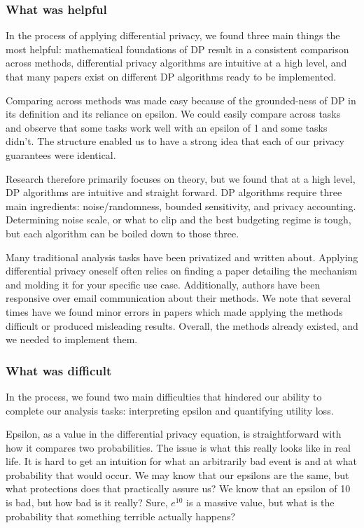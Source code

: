 \documentclass[12pt,letterpaper]{article}
\begin{document}
\subsubsection{What was helpful}
In the process of applying differential privacy, we found three main things the most helpful: mathematical foundations of DP result in a consistent comparison across methods, differential privacy algorithms are intuitive at a high level, and that many papers exist on different DP algorithms ready to be implemented.

Comparing across methods was made easy because of the grounded-ness of DP in its definition and its reliance on epsilon. We could easily compare across tasks and observe that some tasks work well with an epsilon of 1 and some tasks didn't. The structure enabled us to have a strong idea that each of our privacy guarantees were identical.

Research therefore primarily focuses on theory, but we found that at a high level, DP algorithms are intuitive and straight forward. DP algorithms require three main ingredients: noise/randomness, bounded sensitivity, and privacy accounting. Determining noise scale, or what to clip and the best budgeting regime is tough, but each algorithm can be boiled down to those three.

Many traditional analysis tasks have been privatized and written about. Applying differential privacy oneself often relies on finding a paper detailing the mechanism and molding it for your specific use case. Additionally, authors have been responsive over email communication about their methods. We note that several times have we found minor errors in papers which made applying the methods difficult or produced misleading results. Overall, the methods already existed, and we needed to implement them.  

\subsubsection{What was difficult}
In the process, we found two main difficulties that hindered our ability to complete our analysis tasks: interpreting epsilon and quantifying utility loss.

Epsilon, as a value in the differential privacy equation, is straightforward with how it compares two probabilities. The issue is what this really looks like in real life. It is hard to get an intuition for what an arbitrarily bad event is and at what probability that would occur. We may know that our epsilons are the same, but what protections does that practically assure us? We know that an epsilon of 10 is bad, but how bad is it really? Sure, $e^{10}$ is a massive value, but what is the probability that something terrible actually happens?
\end{document}
